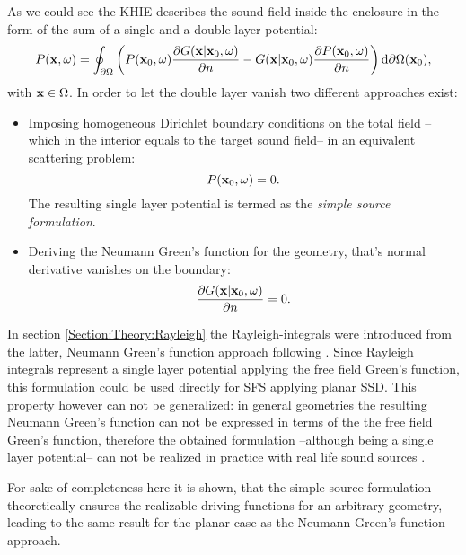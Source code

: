 As we could see the KHIE describes the sound field inside the enclosure in the form of the sum of a single and a double layer potential:
\begin{equation}
P(\mathbf{x},\omega) = 
\oint_{\partial \Omega}  \left( 
P(\mathbf{x}_0,\omega)  \frac{\partial G(\mathbf{x}|\mathbf{x}_0,\omega)}{\partial n}  -  
G(\mathbf{x}|\mathbf{x}_0,\omega) \frac{\partial P(\mathbf{x}_0,\omega)}{\partial n} 
\right)   \mathrm{d} \partial \Omega ( \mathbf{x}_0),
\end{equation}
with $\mathbf{x} \in \Omega$.
In order to let the double layer vanish two different approaches exist:
\begin{itemize}
\item Imposing homogeneous Dirichlet boundary conditions on the total field --which in the interior equals to the target sound field-- in an equivalent scattering problem: 
\begin{equation}
P(\mathbf{x}_0,\omega) = 0.
\end{equation}
The resulting single layer potential is termed as the \emph{simple source formulation}.
\item Deriving the Neumann Green's function for the geometry, that's normal derivative vanishes on the boundary:
\begin{equation}
\frac{\partial G(\mathbf{x}|\mathbf{x}_0,\omega)}{\partial n}  = 0.
\end{equation}
\end{itemize}
In section \ref{Section:Theory:Rayleigh} the Rayleigh-integrals were introduced from the latter, Neumann Green's function approach following \cite{Berkhout1984}. Since Rayleigh integrals represent a single layer potential applying the free field Green's function, this formulation could be used directly for SFS applying planar SSD. 
This property however can not be generalized: in general geometries the resulting Neumann Green's function can not be expressed in terms of the the free field Green's function, therefore the obtained formulation --although being a single layer potential-- can not be realized in practice with real life sound sources \cite{Schultz2014:Comparing_approaches}.

For sake of completeness here it is shown, that the simple source formulation theoretically ensures the realizable driving functions for an arbitrary geometry, leading to the same result for the planar case as the Neumann Green's function approach.

